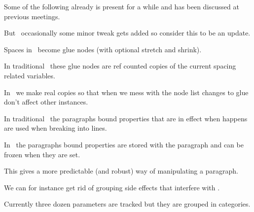 

\definecolor[maincolor] [r=.4,g=.4]
\definecolor[extracolor][s=.1]

\startdocument
  [title={PARAGRAPHS},
   banner={a bit of an upgrade},
   location={context\enspace {\bf 2021}\enspace meeting}]

\starttitle[title=Note]

\startitemize

\startitem
    Some of the following already is present for a while and has been discussed
    at previous meetings.
\stopitem

\startitem
    But \unknown\ occasionally some minor tweak gets added so consider this to be
    an update.
\stopitem

\stopitemize

\starttitle[title=Spacing]

\startitemize

\startitem
    Spaces in \TEX\ become glue nodes (with optional stretch and shrink).
\stopitem

\startitem
    In traditional \TEX\ these glue nodes are ref counted copies of the current
    spacing related variables.
\stopitem

\startitem
    In \LUATEX\ we make real copies so that when we mess with the node list
    changes to glue don't affect other instances.
\stopitem

\stopitemize

\starttitle[title=Parameters]

\startitemize

\startitem
    In traditional \TEX\ the paragraphs bound properties that are in effect
    when \type {\par} happens are used when breaking into lines.
\stopitem

\startitem
    In \LUAMETATEX\ the paragraphs bound properties are stored with the
    paragraph and can be frozen when they are set.
\stopitem

\startitem
    This gives a more predictable (and robust) way of manipulating a
    paragraph.
\stopitem

\startitem
    We can for instance get rid of grouping side effects that interfere with
    \type {\everypar}.
\stopitem

\startitem
    Currently three dozen parameters are tracked but they are grouped in
    categories.
\stopitem

